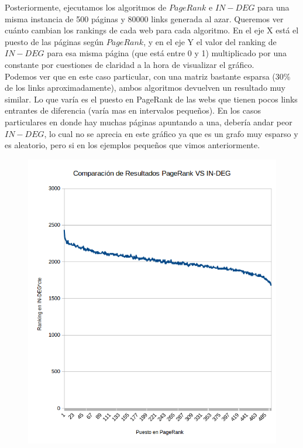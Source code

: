 Posteriormente, ejecutamos los algoritmos de $PageRank$ e $IN-DEG$ para una misma instancia de 500 páginas y 80000 links generada al azar. Queremos ver cuánto cambian los rankings de cada web para cada algoritmo. En el eje X está el puesto de las páginas según $PageRank$, y en el eje Y el valor del ranking de $IN-DEG$ para esa misma página (que está entre 0 y 1) multiplicado por una constante por cuestiones de claridad a la hora de visualizar el gráfico.\\

Podemos ver que en este caso particular, con una matriz bastante esparsa (30\% de los links aproximadamente), ambos algoritmos devuelven un resultado muy similar. Lo que varía es el puesto en PageRank de las webs que tienen pocos links entrantes de diferencia (varía mas en intervalos pequeños). En los casos particulares en donde hay muchas páginas apuntando a una, debería andar peor $IN-DEG$, lo cual no se aprecia en este gráfico ya que es un grafo muy esparso y es aleatorio, pero si en los ejemplos pequeños que vimos anteriormente.\\


\begin{figure}
  \vspace{-20pt}
  \begin{center}
    \includegraphics[scale= 0.6]{imagenes/pagerankVSindeg.png}
  \end{center}
  \vspace{-10pt}
  \vspace{-10pt}
\end{figure}


